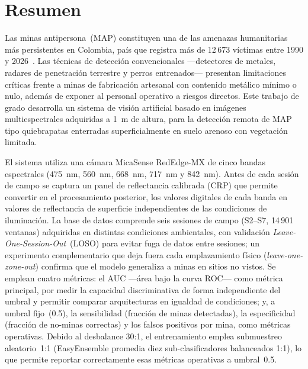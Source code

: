 \chapter*{Resumen}
\thispagestyle{plain}

Las minas antipersona~(MAP) constituyen una de las amenazas humanitarias más
persistentes en Colombia, país que registra más de 12\,673 víctimas entre 1990 y 2026~\cite{aicma2026}.
Las técnicas de detección convencionales ---detectores de metales, radares de
penetración terrestre y perros entrenados--- presentan limitaciones críticas frente
a minas de fabricación artesanal con contenido metálico mínimo o nulo, además de
exponer al personal operativo a riesgos directos. Este trabajo de grado desarrolla
un sistema de visión artificial basado en imágenes multiespectrales adquiridas
a \SI{1}{m} de altura, para la detección remota de \ac{MAP} tipo quiebrapatas
enterradas superficialmente en suelo arenoso con vegetación limitada.

El sistema utiliza una cámara MicaSense RedEdge-MX de cinco bandas espectrales
(\SI{475}{nm}, \SI{560}{nm}, \SI{668}{nm}, \SI{717}{nm} y \SI{842}{nm}). Antes de
cada sesión de campo se captura un panel de reflectancia calibrada (CRP) que permite
convertir en el procesamiento posterior, los valores digitales de cada banda en
valores de reflectancia de superficie independientes de las condiciones de iluminación.
La base de datos comprende seis sesiones de campo (S2--S7, 14\,901 ventanas)
adquiridas en distintas condiciones ambientales, con validación
\textit{Leave-One-Session-Out}~(LOSO) para evitar fuga de datos entre sesiones; un
experimento complementario que deja fuera cada emplazamiento físico
(\textit{leave-one-zone-out}) confirma que el modelo generaliza a minas en sitios no vistos.
Se emplean cuatro métricas: el \ac{AUC} ---área bajo la curva ROC--- como métrica
principal, por medir la capacidad discriminativa de forma independiente del umbral
y permitir comparar arquitecturas en igualdad de condiciones; y, a umbral fijo~(0.5),
la sensibilidad (fracción de minas detectadas), la especificidad (fracción de
no-minas correctas) y los falsos positivos por mina, como métricas operativas.
Debido al desbalance 30:1, el entrenamiento emplea submuestreo aleatorio~1:1
(EasyEnsemble promedia diez sub-clasificadores balanceados 1:1), lo que permite
reportar correctamente esas métricas operativas a umbral~0.5.

